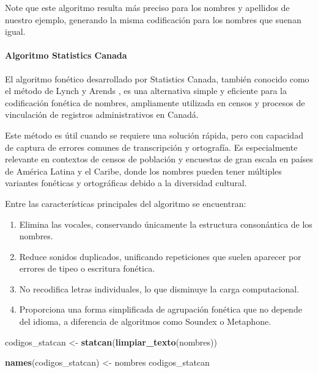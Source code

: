 \documentclass[
  12pt,
]{book}
\newenvironment{Shaded}{\begin{snugshade}}{\end{snugshade}}
\newcommand{\FunctionTok}[1]{\textcolor[rgb]{0.13,0.29,0.53}{\textbf{#1}}}
\newcommand{\NormalTok}[1]{#1}
\newcommand{\OtherTok}[1]{\textcolor[rgb]{0.56,0.35,0.01}{#1}}
\providecommand{\tightlist}{%
  \setlength{\itemsep}{0pt}\setlength{\parskip}{0pt}}
\begin{document}
Note que este algoritmo resulta más preciso para los nombres y apellidos de nuestro ejemplo, generando la misma codificación para los nombres que suenan igual.

\paragraph{Algoritmo Statistics Canada}\label{algoritmo-statistics-canada}

El algoritmo fonético desarrollado por Statistics Canada, también conocido como el método de Lynch y Arends \citep{lynch1977selection}, es una alternativa simple y eficiente para la codificación fonética de nombres, ampliamente utilizada en censos y procesos de vinculación de registros administrativos en Canadá.

Este método es útil cuando se requiere una solución rápida, pero con capacidad de captura de errores comunes de transcripción y ortografía. Es especialmente relevante en contextos de censos de población y encuestas de gran escala en países de América Latina y el Caribe, donde los nombres pueden tener múltiples variantes fonéticas y ortográficas debido a la diversidad cultural.

Entre las características principales del algoritmo se encuentran:

\begin{enumerate}
\def\labelenumi{\arabic{enumi}.}
\tightlist
\item
  Elimina las vocales, conservando únicamente la estructura consonántica de los nombres.
\item
  Reduce sonidos duplicados, unificando repeticiones que suelen aparecer por errores de tipeo o escritura fonética.
\item
  No recodifica letras individuales, lo que disminuye la carga computacional.
\item
  Proporciona una forma simplificada de agrupación fonética que no depende del idioma, a diferencia de algoritmos como Soundex o Metaphone.
\end{enumerate}

\begin{Shaded}
\begin{Highlighting}[]
\NormalTok{codigos\_statcan }\OtherTok{\textless{}{-}} \FunctionTok{statcan}\NormalTok{(}\FunctionTok{limpiar\_texto}\NormalTok{(nombres))}

\FunctionTok{names}\NormalTok{(codigos\_statcan) }\OtherTok{\textless{}{-}}\NormalTok{ nombres}
\NormalTok{codigos\_statcan}
\end{Highlighting}
\end{Shaded}
\end{document}
